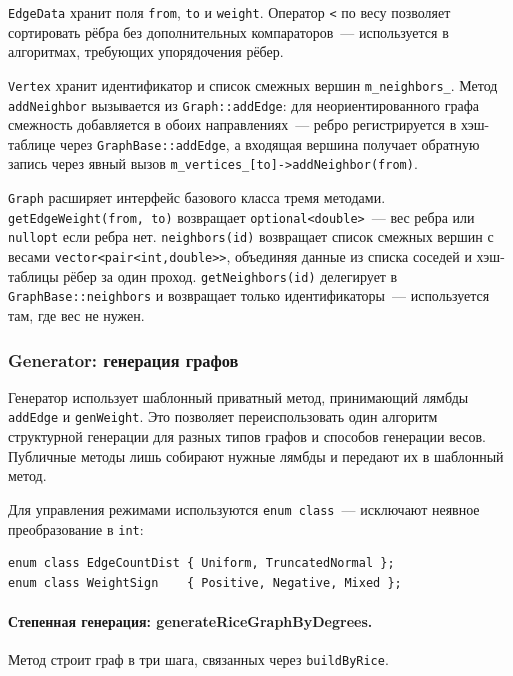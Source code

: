 \texttt{EdgeData} хранит поля \texttt{from}, \texttt{to} и \texttt{weight}.
Оператор \texttt{<} по весу позволяет сортировать рёбра без дополнительных
компараторов~--- используется в алгоритмах, требующих упорядочения рёбер.

\texttt{Vertex} хранит идентификатор и список смежных вершин
\texttt{m\_neighbors\_}. Метод \texttt{addNeighbor} вызывается из
\texttt{Graph::addEdge}: для неориентированного графа смежность
добавляется в обоих направлениях~--- ребро регистрируется в хэш-таблице
через \texttt{GraphBase::addEdge}, а входящая вершина получает обратную
запись через явный вызов \texttt{m\_vertices\_[to]->addNeighbor(from)}.

\texttt{Graph} расширяет интерфейс базового класса тремя методами. \\
\texttt{getEdgeWeight(from, to)} возвращает \texttt{optional<double>}~---
вес ребра или \texttt{nullopt} если ребра нет.
\texttt{neighbors(id)} возвращает список смежных вершин с весами
\texttt{vector<pair<int,double>>}, объединяя данные из списка соседей
и хэш-таблицы рёбер за один проход.
\texttt{getNeighbors(id)} делегирует в \texttt{GraphBase::neighbors}
и возвращает только идентификаторы~--- используется там, где вес не нужен.

\subsubsection{Generator: генерация графов}

Генератор использует шаблонный приватный метод,
принимающий лямбды \texttt{addEdge} и \texttt{genWeight}. Это позволяет
переиспользовать один алгоритм структурной генерации для разных типов
графов и способов генерации весов. Публичные методы лишь собирают
нужные лямбды и передают их в шаблонный метод.

Для управления режимами используются \texttt{enum class}~--- исключают
неявное преобразование в \texttt{int}:

\begin{lstlisting}[style=cppstyle, caption={Перечисления параметров генератора (Generator.h)}]
enum class EdgeCountDist { Uniform, TruncatedNormal };
enum class WeightSign    { Positive, Negative, Mixed };
\end{lstlisting}

\paragraph{Степенная генерация: generateRiceGraphByDegrees.}
Метод строит граф в три шага, связанных через \texttt{buildByRice}.

